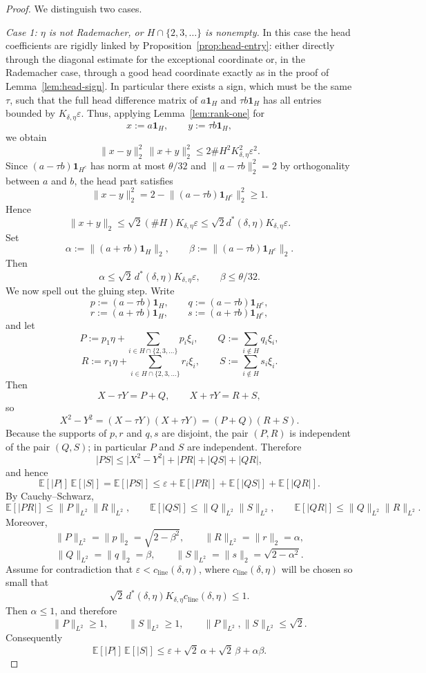 \documentclass[11pt]{amsart}
\numberwithin{equation}{section}
\theoremstyle{definition}
\theoremstyle{remark}
\newcommand{\E}{\mathbb E}
\newcommand{\eps}{\varepsilon}
\newcommand{\abs}[1]{\lvert #1 \rvert}
\newcommand{\norm}[1]{\lVert #1 \rVert}
\begin{document}
\begin{proof}
We distinguish two cases.

\smallskip
\noindent\emph{Case 1: $\eta$ is not Rademacher, or $H\cap\{2,3,\dots\}$ is
nonempty.}
In this case the head coefficients are rigidly linked by
Proposition~\ref{prop:head-entry}: either directly through the diagonal
estimate for the exceptional coordinate or, in the Rademacher case, through a
good head coordinate exactly as in the proof of Lemma~\ref{lem:head-sign}.  In
particular there exists a sign, which must be the same $\tau$, such that the
full head difference matrix of $a\mathbf 1_H$ and $\tau b\mathbf 1_H$ has all
entries bounded by $K_{\delta,\eta}\eps$. Thus, applying Lemma~\ref{lem:rank-one} for
\[
x:=a\mathbf 1_H,
\qquad
y:=\tau b\mathbf 1_H,
\]
we obtain 
\[
\norm{x-y}_2^2\,\norm{x+y}_2^2
\le 2\#H^2 K_{\delta,\eta}^2\eps^2.
\]
Since $(a-\tau b)\mathbf{1}_{H^c}$ has norm at most $\theta/32$ and
$\norm{a-\tau b}_2^2=2$ by orthogonality between $a$ and $b$, the head part satisfies
\[
\norm{x-y}_2^2
=2-\norm{(a-\tau b)\mathbf 1_{H^c}}_2^2
\ge 1.
\]
	Hence
	\[
	\norm{x+y}_2\le \sqrt{2}(\#H) K_{\delta,\eta}\eps
	\le \sqrt{2}d^*(\delta,\eta)K_{\delta,\eta}\eps.
	\]
	Set
	\[
	\alpha:=\norm{(a+\tau b)\mathbf 1_H}_2,
	\qquad
	\beta:=\norm{(a-\tau b)\mathbf 1_{H^c}}_2.
	\]
	Then
	\[
	\alpha\le \sqrt2\,d^*(\delta,\eta)K_{\delta,\eta}\eps,
	\qquad
	\beta\le \theta/32.
	\]
	We now spell out the gluing step.  Write
	\[
	p:=(a-\tau b)\mathbf 1_H,
	\qquad
	q:=(a-\tau b)\mathbf 1_{H^c},
	\]
	\[
	r:=(a+\tau b)\mathbf 1_H,
	\qquad
	s:=(a+\tau b)\mathbf 1_{H^c},
	\]
	and let
	\[
	P:=p_1\eta+\sum_{i\in H\cap\{2,3,\dots\}} p_i\xi_i,
	\qquad
	Q:=\sum_{i\notin H} q_i\xi_i,
	\]
	\[
	R:=r_1\eta+\sum_{i\in H\cap\{2,3,\dots\}} r_i\xi_i,
	\qquad
	S:=\sum_{i\notin H} s_i\xi_i.
	\]
	Then
	\[
	X-\tau Y=P+Q,
	\qquad
	X+\tau Y=R+S,
	\]
	so
	\[
	X^2-Y^2
	=(X-\tau Y)(X+\tau Y)
	=(P+Q)(R+S).
	\]
	Because the supports of $p,r$ and $q,s$ are disjoint, the pair $(P,R)$ is
	independent of the pair $(Q,S)$; in particular $P$ and $S$ are independent.
	Therefore
	\[
	\abs{PS}\le \abs{X^2-Y^2}+\abs{PR}+\abs{QS}+\abs{QR},
	\]
	and hence
	\[
	\E[\abs{P}]\,\E[\abs{S}]
	=\E[\abs{PS}]
	\le
	\eps+\E[\abs{PR}]+\E[\abs{QS}]+\E[\abs{QR}].
	\]
	By Cauchy--Schwarz,
	\[
	\E[\abs{PR}]\le \norm{P}_{L^2}\norm{R}_{L^2},
	\qquad
	\E[\abs{QS}]\le \norm{Q}_{L^2}\norm{S}_{L^2},
	\qquad
	\E[\abs{QR}]\le \norm{Q}_{L^2}\norm{R}_{L^2}.
	\]
	Moreover,
	\[
	\norm{P}_{L^2}=\norm{p}_2=\sqrt{2-\beta^2},
	\qquad
	\norm{R}_{L^2}=\norm{r}_2=\alpha,
	\]
	\[
	\norm{Q}_{L^2}=\norm{q}_2=\beta,
	\qquad
	\norm{S}_{L^2}=\norm{s}_2=\sqrt{2-\alpha^2}.
	\]
	Assume for contradiction that $\eps<c_{\mathrm{line}}(\delta,\eta)$, where
	$c_{\mathrm{line}}(\delta,\eta)$ will be chosen so small that
	\[
	\sqrt2\,d^*(\delta,\eta)K_{\delta,\eta}c_{\mathrm{line}}(\delta,\eta)\le1.
	\]
	Then $\alpha\le1$, and therefore
	\[
	\norm{P}_{L^2}\ge1,
	\qquad
	\norm{S}_{L^2}\ge1,
	\qquad
	\norm{P}_{L^2},\norm{S}_{L^2}\le \sqrt2.
	\]
	Consequently
	\[
	\E[\abs{P}]\,\E[\abs{S}]
	\le
	\eps+\sqrt2\,\alpha+\sqrt2\,\beta+\alpha\beta.
	\]


\end{proof}
\end{document}
